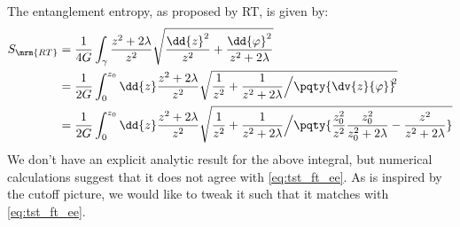 \documentclass[a4paper
	,10pt
]{article}
\begin{document}
	The entanglement entropy, as proposed by RT, is given by:
	\begin{equation}
	\begin{aligned}
	  S_\mrm{RT}
	  &= \frac{1}{4G} \int_\gamma
	    \frac{z^2 + 2\lambda}{z^2}
	    \sqrt{
	        \frac{\dd{z}^2}{z^2}
	        + \frac{\dd{\varphi}^2}{z^2 + 2\lambda}
	    } \\
	  &= \frac{1}{2G} \int_0^{z_0} \dd{z}
	    \frac{z^2 + 2\lambda}{z^2}
	      \sqrt{
	          \frac{1}{z^2}
	          + \frac{1}{z^2 + 2\lambda}
	          \Big/
	          \pqty{\dv{z}{\varphi}}^{\!\!2}
	      } \\
	  &= \frac{1}{2G} \int_0^{z_0} \dd{z}
	    \frac{z^2 + 2\lambda}{z^2}
	      \sqrt{
	          \frac{1}{z^2}
	          + \frac{1}{z^2 + 2\lambda}
	          \Big/
	          \pqty{
					\frac{z_0^2}{z^2}
					\frac{z_0^2}{z_0^2 + 2\lambda}
					- \frac{z^2}{z^2 + 2\lambda}
	          }
	      }
	\end{aligned}
	\end{equation}
	We don't have an explicit analytic result for the above integral, but numerical calculations suggest that it does not agree with \eqref{eq:tst_ft_ee}. 
	As is inspired by the cutoff picture, we would like to tweak it such that it matches with \eqref{eq:tst_ft_ee}. 
	
\end{document}
